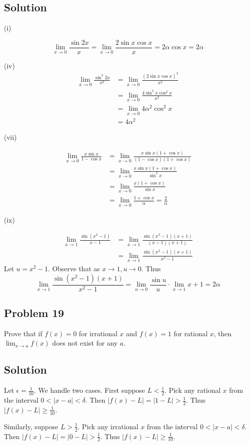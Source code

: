 \subsection*{Solution}

(i)

\[\lim_{x\to 0}\frac{\sin 2x}{x}=\lim_{x\to 0}\frac{2\sin x\cos x}{x}=2 \alpha \cos x=2\alpha\]

(iv)
\begin{align*}
\lim_{x\to 0}\frac{\sin^2 2x}{x^2}&=\lim_{x\to 0}\frac{(2\sin x\cos x)^2}{x^2}\\
&=\lim_{x\to 0}\frac{4\sin^2x\cos^2x}{x^2}\\
&=\lim_{x\to 0}4\alpha^2\cos^2x\\
&=4\alpha^2
\end{align*}

(vii)

\begin{align*}
    \lim_{x\to 0}\frac{x\sin x}{1-\cos x}&=\lim_{x\to 0}\frac{x\sin x(1+\cos x)}{(1-\cos x)(1+\cos x)}\\
    &=\lim_{x\to 0}\frac{x\sin x(1+\cos x)}{\sin^2 x}\\
    &=\lim_{x\to 0}\frac{x(1+\cos x)}{\sin x}\\
    &=\lim_{x\to 0}\frac{1+\cos x}{\alpha}=\frac{2}{\alpha}
\end{align*}

(ix)

\begin{align*}
    \lim_{x\to 1}\frac{\sin(x^2-1)}{x-1}&=\lim_{x\to 1}\frac{\sin(x^2-1)(x+1)}{(x-1)(x+1)}\\
    &=\lim_{x\to 1}\frac{\sin(x^2-1)(x+1)}{x^2-1}
\end{align*}
Let $u=x^2-1$. Observe that as $x\to 1, u\to 0$. Thus
\[\lim_{x\to 1}\frac{\sin(x^2-1)(x+1)}{x^2-1}=\lim_{u\to 0}\frac{\sin u}{u}\cdot \lim_{x\to 1} x+1=2\alpha\]

\subsection*{Problem 19}
Prove that if $f(x)=0$ for irrational $x$ and $f(x)=1$ for rational $x$, then $\lim_{x\to a}f(x)$ does not exist for any $a$.

\subsection*{Solution}
Let $\epsilon=\frac{1}{10}$. We handle two cases. First suppose $L<\frac{1}{2}$. Pick any rational $x$ from the interval $0<|x-a|<\delta$. Then $|f(x)-L|=|1-L|>\frac{1}{2}$. Thus $|f(x)-L|\geq\frac{1}{10}$.

\vs

Similarly, suppose $L>\frac{1}{2}$. Pick any irrational $x$ from the interval $0<|x-a|<\delta$. Then $|f(x)-L|=|0-L|>\frac{1}{2}$. Thus $|f(x)-L|\geq\frac{1}{10}$.


